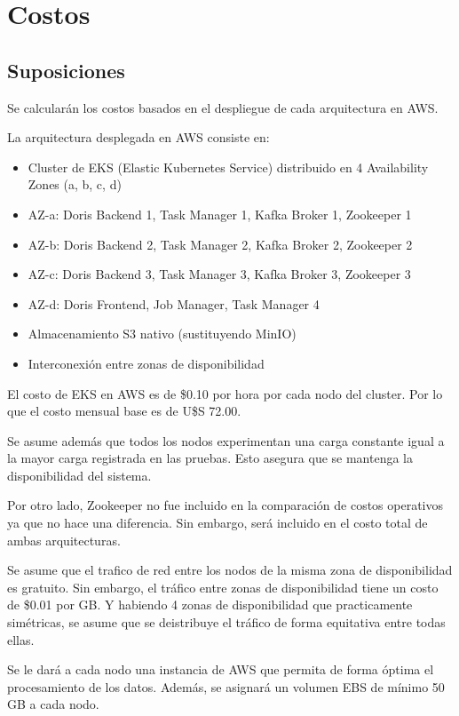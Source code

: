 \section{Costos}

\subsection{Suposiciones}
Se calcularán los costos basados en el despliegue de cada arquitectura en AWS.

La arquitectura desplegada en AWS consiste en:

\begin{itemize}
    \item Cluster de EKS (Elastic Kubernetes Service) distribuido en 4 Availability Zones (a, b, c, d)
    \item AZ-a: Doris Backend 1, Task Manager 1, Kafka Broker 1, Zookeeper 1
    \item AZ-b: Doris Backend 2, Task Manager 2, Kafka Broker 2, Zookeeper 2
    \item AZ-c: Doris Backend 3, Task Manager 3, Kafka Broker 3, Zookeeper 3
    \item AZ-d: Doris Frontend, Job Manager, Task Manager 4
    \item Almacenamiento S3 nativo (sustituyendo MinIO)
    \item Interconexión entre zonas de disponibilidad
\end{itemize}

El costo de EKS en AWS es de \$0.10 por hora por cada nodo del cluster.
Por lo que el costo mensual base es de U\$S 72.00.

Se asume además que todos los nodos experimentan una carga constante igual a la mayor carga registrada en las pruebas. 
Esto asegura que se mantenga la disponibilidad del sistema.

Por otro lado, Zookeeper no fue incluido en la comparación de costos operativos ya que no hace una diferencia. 
Sin embargo, será incluido en el costo total de ambas arquitecturas.

Se asume que el trafico de red entre los nodos de la misma zona de disponibilidad es gratuito. 
Sin embargo, el tráfico entre zonas de disponibilidad tiene un costo de \$0.01 por GB.
Y habiendo 4 zonas de disponibilidad que practicamente simétricas, se asume que se deistribuye el tráfico de forma equitativa entre todas ellas.

Se le dará a cada nodo una instancia de AWS que permita de forma óptima el procesamiento de los datos. 
Además, se asignará un volumen EBS de mínimo 50 GB a cada nodo.

